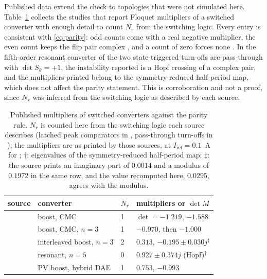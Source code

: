 \documentclass[journal]{IEEEtran}
\begin{document}
Published data extend the check to topologies that were not simulated here.
Table~\ref{tab:literatura} collects the studies that report Floquet
multipliers of a switched converter with enough detail to count $N_r$ from
the switching logic. Every entry is consistent with \eqref{eq:parity}: odd
counts come with a real negative multiplier, the even count keeps the flip
pair complex \cite{giaouris2013foldings}, and a count of zero forces none
\cite{dranga2003stability}. In the fifth-order resonant converter of
\cite{dranga2003stability} the two state-triggered turn-offs are
pass-through with $\det S_k=+1$, the instability reported is a Hopf crossing
of a complex pair, and the multipliers printed belong to the
symmetry-reduced half-period map, which does not affect the parity
statement. This is corroboration and not a proof, since $N_r$ was inferred
from the switching logic as described by each source.

\begin{table}[!t]
\caption{Published multipliers of switched converters against the parity
rule. $N_r$ is counted here from the switching logic each source describes
(latched peak comparators in \cite{parui2002border,imrayed2013controlling,
giaouris2013foldings,hayes2020application}, pass-through turn-offs in
\cite{dranga2003stability}); the multipliers are as printed by those sources,
at $I_{\mathrm{ref}}=0.1$~A for \cite{giaouris2013foldings}; $\dagger$:
eigenvalues of the symmetry-reduced half-period map; $\ddagger$: the source
prints an imaginary part of $0.0014$ and a modulus of $0.1972$ in the same
row, and the value recomputed here, $0.0295$, agrees with the modulus.}
\label{tab:literatura}
\centering
\footnotesize
\setlength{\tabcolsep}{3pt}
\begin{tabular}{@{}llll@{}}
\toprule
source & converter & $N_r$ & multipliers or $\det M$ \\
\midrule
\cite{parui2002border} & boost, CMC & 1 & $\det=-1.219$, $-1.588$ \\
\cite{imrayed2013controlling} & boost, CMC, $n=3$ & 1 & $-0.970$, then $-1.000$ \\
\cite{giaouris2013foldings} & interleaved boost, $n=3$ & 2 & $0.313$, $-0.195\pm0.030j^{\ddagger}$ \\
\cite{dranga2003stability} & resonant, $n=5$ & 0 & $0.927\pm0.374j$ (Hopf)$^{\dagger}$ \\
\cite{hayes2020application} & PV boost, hybrid DAE & 1 & $0.753$, $-0.993$ \\
\bottomrule
\end{tabular}
\end{table}
\end{document}
